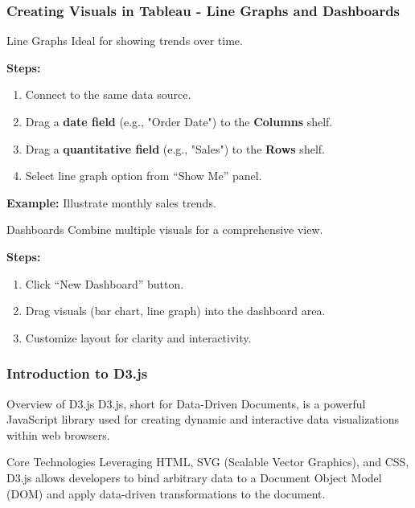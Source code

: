 \documentclass{beamer}
\begin{document}
\begin{frame}[fragile]
    \frametitle{Creating Visuals in Tableau - Line Graphs and Dashboards}
    \begin{block}{Line Graphs}
        Ideal for showing trends over time.
    \end{block}
    \textbf{Steps:}
    \begin{enumerate}
        \item Connect to the same data source.
        \item Drag a \textbf{date field} (e.g., "Order Date") to the \textbf{Columns} shelf.
        \item Drag a \textbf{quantitative field} (e.g., "Sales") to the \textbf{Rows} shelf.
        \item Select line graph option from “Show Me” panel.
    \end{enumerate}
    \textbf{Example:} Illustrate monthly sales trends.

    \begin{block}{Dashboards}
        Combine multiple visuals for a comprehensive view.
    \end{block}
    \textbf{Steps:}
    \begin{enumerate}
        \item Click “New Dashboard” button.
        \item Drag visuals (bar chart, line graph) into the dashboard area.
        \item Customize layout for clarity and interactivity.
    \end{enumerate}
\end{frame}

\begin{frame}
    \frametitle{Introduction to D3.js}
    \begin{block}{Overview of D3.js}
        D3.js, short for Data-Driven Documents, is a powerful JavaScript library used for creating dynamic and interactive data visualizations within web browsers. 
    \end{block}
    \begin{block}{Core Technologies}
        Leveraging HTML, SVG (Scalable Vector Graphics), and CSS, D3.js allows developers to bind arbitrary data to a Document Object Model (DOM) and apply data-driven transformations to the document.
    \end{block}
\end{frame}
\end{document}
